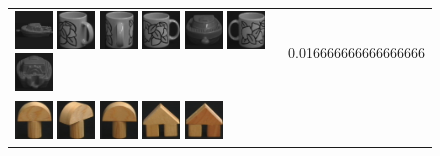 \begin{figure}[tbp]
\begin{center}
\begin{tabular}{m{11cm} | m{3cm} |}
\includegraphics[width=1cm]{coil/beeld-24.eps}
\includegraphics[width=1cm]{coil/beeld-49.eps}
\includegraphics[width=1cm]{coil/beeld-50.eps}
\includegraphics[width=1cm]{coil/beeld-48.eps}
\includegraphics[width=1cm]{coil/beeld-28.eps}
\includegraphics[width=1cm]{coil/beeld-51.eps}
\includegraphics[width=1cm]{coil/beeld-26.eps}
& {\scriptsize 0.016666666666666666}
\\
\includegraphics[width=1cm]{coil/beeld-0.eps}
\includegraphics[width=1cm]{coil/beeld-3.eps}
\includegraphics[width=1cm]{coil/beeld-1.eps}
\includegraphics[width=1cm]{coil/beeld-42.eps}
\includegraphics[width=1cm]{coil/beeld-43.eps}

\end{tabular}
\end{center}
\end{figure}
